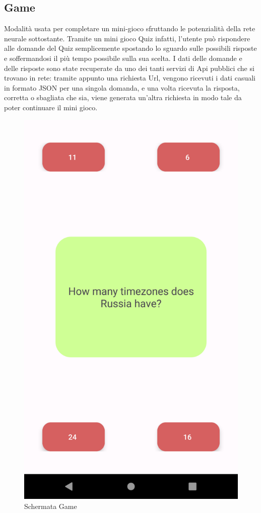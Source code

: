 \documentclass[11pt]{article}
\begin{document}
\subsection{Game}
Modalità usata per completare un mini-gioco sfruttando le potenzialità della rete neurale sottostante. Tramite un mini gioco Quiz infatti, l'utente può rispondere alle domande del Quiz semplicemente spostando lo sguardo sulle possibili risposte e soffermandosi il più tempo possibile sulla sua scelta. I dati delle domande e delle risposte sono state recuperate da uno dei tanti servizi di Api pubblici che si trovano in rete: tramite appunto una richiesta Url, vengono ricevuti i dati casuali in formato JSON per una singola domanda, e una volta ricevuta la risposta, corretta o sbagliata che sia, viene generata un'altra richiesta in modo tale da poter continuare il mini gioco. 
\begin{figure}[h]
	\centering
	\caption{Schermata Game}
	\includegraphics[scale=0.2]{img/game.png}
\end{figure}
\end{document}
